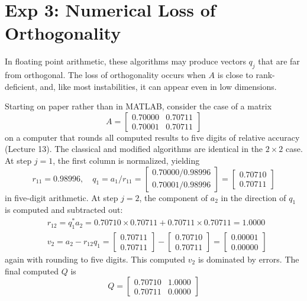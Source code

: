 \section{Exp 3: Numerical Loss of Orthogonality} 
 In floating point arithmetic, these algorithms may produce vectors $q_j$ that are far from orthogonal. The loss of orthogonality occurs when $A$ is close to rank-deficient, and, like most instabilities, it can appear even in low dimensions.

Starting on paper rather than in MATLAB, consider the case of a matrix
$$
A=\left[\begin{array}{ll}
0.70000 & 0.70711 \\
0.70001 & 0.70711
\end{array}\right]
$$
on a computer that rounds all computed results to five digits of relative accuracy (Lecture 13). The classical and modified algorithms are identical in the $2 \times 2$ case. At step $j=1$, the first column is normalized, yielding
$$
r_{11}=0.98996, \quad q_1=a_1 / r_{11}=\left[\begin{array}{c}
0.70000 / 0.98996 \\
0.70001 / 0.98996
\end{array}\right]=\left[\begin{array}{c}
0.70710 \\
0.70711
\end{array}\right]
$$
in five-digit arithmetic. At step $j=2$, the component of $a_2$ in the direction of $q_1$ is computed and subtracted out:
$$
\begin{aligned}
& r_{12}=q_1^* a_2=0.70710 \times 0.70711+0.70711 \times 0.70711=1.0000 \\
& v_2=a_2-r_{12} q_1=\left[\begin{array}{l}
0.70711 \\
0.70711
\end{array}\right]-\left[\begin{array}{l}
0.70710 \\
0.70711
\end{array}\right]=\left[\begin{array}{l}
0.00001 \\
0.00000
\end{array}\right]
\end{aligned}
$$
again with rounding to five digits. This computed $v_2$ is dominated by errors. The final computed $Q$ is
$$
Q=\left[\begin{array}{ll}
0.70710 & 1.0000 \\
0.70711 & 0.0000
\end{array}\right]
$$

